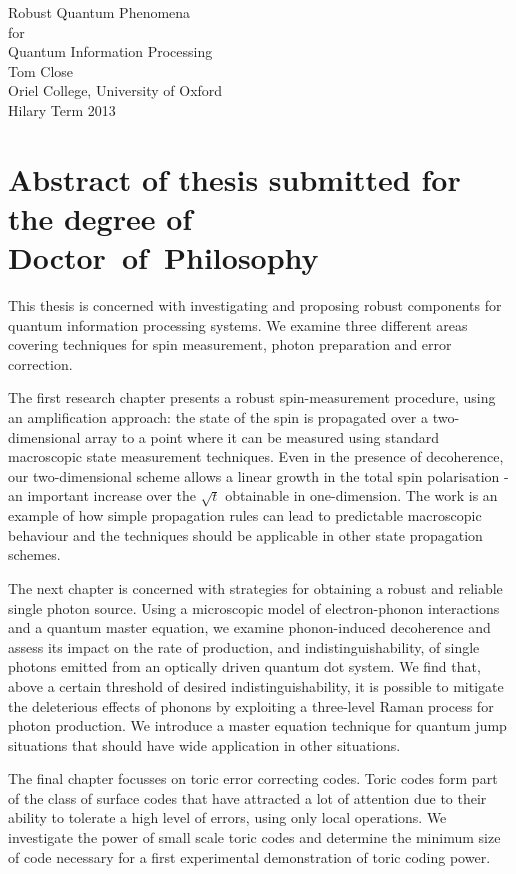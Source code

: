 \vspace{-2cm}
\enlargethispage{2cm}
\begin{center}

  {\Huge Robust Quantum Phenomena \\[0.0cm] 
               for \\[0.3cm] 
               Quantum Information Processing}\\[1cm]

  {\large Tom Close\\
               Oriel College, University of Oxford\\
               Hilary Term 2013\\[1cm]
  }

\end{center}
 
\section*{Abstract of thesis submitted for the degree of \mbox{Doctor of Philosophy}} 

This thesis is concerned with investigating and proposing robust components for quantum information processing systems. We examine three different areas covering techniques for spin measurement, photon preparation and error correction.

The first research chapter presents a robust spin-measurement procedure, using an amplification approach: the state of the spin is propagated over a two-dimensional array to a point where it can be measured using standard macroscopic state measurement techniques. Even in the presence of decoherence, our two-dimensional scheme allows a linear growth in the total spin polarisation - an important increase over the $\sqrt{t}$ obtainable in one-dimension. The work is an example of how simple propagation rules can lead to predictable macroscopic behaviour and the techniques should be applicable in other state propagation schemes. 

The next chapter is concerned with strategies for obtaining a robust and reliable single photon source. Using a microscopic model of electron-phonon interactions and a quantum master equation, we examine phonon-induced decoherence and assess its impact on the rate of production, and indistinguishability, of single photons emitted from an optically driven quantum dot system. We find that, above a certain threshold of desired indistinguishability, it is possible to mitigate the deleterious effects of phonons by exploiting a three-level Raman process for photon production. We introduce a master equation technique for quantum jump situations that should have wide application in other situations.

The final chapter focusses on toric error correcting codes. Toric codes form part of the class of surface codes that have attracted a lot of attention due to their ability to tolerate a high level of errors, using only local operations. We investigate the power of small scale toric codes and determine the minimum size of code necessary for a first experimental demonstration of toric coding power.


